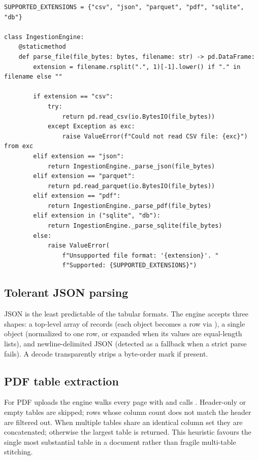 \begin{lstlisting}[style=py,caption={Format dispatch in \code{IngestionEngine.parse\_file}.}]
SUPPORTED_EXTENSIONS = {"csv", "json", "parquet", "pdf", "sqlite", "db"}

class IngestionEngine:
    @staticmethod
    def parse_file(file_bytes: bytes, filename: str) -> pd.DataFrame:
        extension = filename.rsplit(".", 1)[-1].lower() if "." in filename else ""

        if extension == "csv":
            try:
                return pd.read_csv(io.BytesIO(file_bytes))
            except Exception as exc:
                raise ValueError(f"Could not read CSV file: {exc}") from exc
        elif extension == "json":
            return IngestionEngine._parse_json(file_bytes)
        elif extension == "parquet":
            return pd.read_parquet(io.BytesIO(file_bytes))
        elif extension == "pdf":
            return IngestionEngine._parse_pdf(file_bytes)
        elif extension in ("sqlite", "db"):
            return IngestionEngine._parse_sqlite(file_bytes)
        else:
            raise ValueError(
                f"Unsupported file format: '{extension}'. "
                f"Supported: {SUPPORTED_EXTENSIONS}")
\end{lstlisting}

\subsection{Tolerant JSON parsing}
JSON is the least predictable of the tabular formats. The engine accepts three
shapes: a top-level array of records (each object becomes a row via
), a single object (normalized to one row, or expanded when
its values are equal-length lists), and newline-delimited JSON (detected as a
fallback when a strict parse fails). A  decode transparently
strips a byte-order mark if present.

\subsection{PDF table extraction}
For PDF uploads the engine walks every page with  and calls
. Header-only or empty tables are skipped; rows whose
column count does not match the header are filtered out. When multiple tables
share an identical column set they are concatenated; otherwise the largest table
is returned. This heuristic favours the single most substantial table in a
document rather than fragile multi-table stitching.

